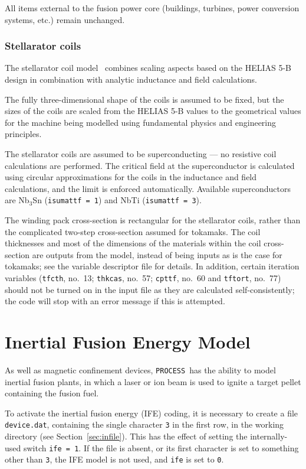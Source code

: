 \documentclass[11pt,a4paper]{report}
\newcommand{\process}{\mbox{\texttt{PROCESS}}}
\begin{document}
All items external to the fusion power core (buildings, turbines, power
conversion systems, etc.) remain unchanged.

\subsubsection{Stellarator coils}

The stellarator coil model~\cite{stell_coil, stell_coil2} combines scaling
aspects based on the HELIAS 5-B design in combination with analytic inductance
and field calculations.

The fully three-dimensional shape of the coils is assumed to be fixed, but the
sizes of the coils are scaled from the HELIAS 5-B values to the geometrical
values for the machine being modelled using fundamental physics and
engineering principles.

The stellarator coils are assumed to be superconducting --- no resistive coil
calculations are performed.  The critical field at the superconductor is
calculated using circular approximations for the coils in the inductance and
field calculations, and the limit is enforced automatically. Available
superconductors are Nb$_3$Sn (\texttt{isumattf = 1}) and NbTi
(\texttt{isumattf = 3}).

The winding pack cross-section is rectangular for the stellarator coils,
rather than the complicated two-step cross-section assumed for tokamaks. The
coil thicknesses and most of the dimensions of the materials within the coil
cross-section are outputs from the model, instead of being inputs as is the
case for tokamaks; see the variable descriptor file for details. In addition,
certain iteration variables (\texttt{tfcth}, no.\ 13; \texttt{thkcas}, no.\
57; \texttt{cpttf}, no.\ 60 and \texttt{tftort}, no.\ 77) should not be turned
on in the input file as they are calculated self-consistently; the code will
stop with an error message if this is attempted.

\section{Inertial Fusion Energy Model}
\label{sec:ife}

As well as magnetic confinement devices, \process\ has the ability to model
inertial fusion plants, in which a laser or ion beam is used to ignite a
target pellet containing the fusion fuel.

To activate the inertial fusion energy (IFE) coding, it is necessary to create
a file \texttt{device.dat}, containing the single character \texttt{3} in the
first row, in the working directory (see Section~\ref{sec:infile}). This has
the effect of setting the internally-used switch \texttt{ife = 1}. If the file
is absent, or its first character is set to something other than \texttt{3},
the IFE model is not used, and \texttt{ife} is set to \texttt{0}.
\end{document}
